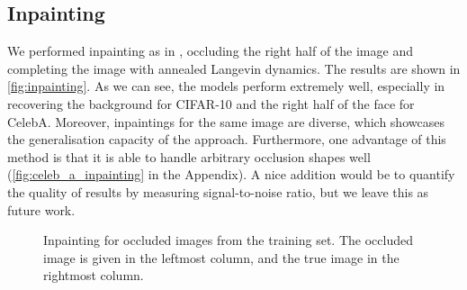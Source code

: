 \subsection{Inpainting}
We performed inpainting as in \cite{ncsn-paper}, occluding the right half of the image and completing the image with annealed Langevin dynamics. The results are shown in \autoref{fig:inpainting}. As we can see, the models perform extremely well, especially in recovering the background for CIFAR-10 and the right half of the face for CelebA. Moreover, inpaintings for the same image are diverse, which showcases the generalisation capacity of the approach. Furthermore, one advantage of this method is that it is able to handle arbitrary occlusion shapes well (\autoref{fig:celeb_a_inpainting} in the Appendix). A nice addition would be to quantify the quality of results by measuring signal-to-noise ratio, but we leave this as future work.

\begin{figure}[h!]
  \centering
     \hspace{1mm}
     \hspace{1mm}
     \caption{Inpainting for occluded images from the training set. The occluded image is given in the leftmost column, and the true image in the rightmost column.}
     \label{fig:inpainting}
\end{figure}

